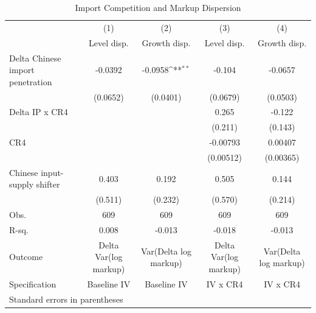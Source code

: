 \begin{table}[htbp]\centering
\def\sym#1{\ifmmode^{#1}\else\(^{#1}\)\fi}
\caption{Import Competition and Markup Dispersion}
\begin{tabular}{l*{4}{c}}
\toprule
                    &\multicolumn{1}{c}{(1)}&\multicolumn{1}{c}{(2)}&\multicolumn{1}{c}{(3)}&\multicolumn{1}{c}{(4)}\\
                    &\multicolumn{1}{c}{Level disp.}&\multicolumn{1}{c}{Growth disp.}&\multicolumn{1}{c}{Level disp.}&\multicolumn{1}{c}{Growth disp.}\\
\midrule
Delta Chinese import penetration&     -0.0392         &     -0.0958\sym{**} &      -0.104         &     -0.0657         \\
                    &    (0.0652)         &    (0.0401)         &    (0.0679)         &    (0.0503)         \\
\addlinespace
Delta IP x CR4      &                     &                     &       0.265         &      -0.122         \\
                    &                     &                     &     (0.211)         &     (0.143)         \\
\addlinespace
CR4                 &                     &                     &    -0.00793         &     0.00407         \\
                    &                     &                     &   (0.00512)         &   (0.00365)         \\
\addlinespace
Chinese input-supply shifter&       0.403         &       0.192         &       0.505         &       0.144         \\
                    &     (0.511)         &     (0.232)         &     (0.570)         &     (0.214)         \\
\midrule
Obs.                &         609         &         609         &         609         &         609         \\
R-sq.               &       0.008         &      -0.013         &      -0.018         &      -0.013         \\
Outcome             &Delta Var(log markup)         &Var(Delta log markup)         &Delta Var(log markup)         &Var(Delta log markup)         \\
Specification       & Baseline IV         & Baseline IV         &    IV x CR4         &    IV x CR4         \\
\bottomrule
\multicolumn{5}{l}{\footnotesize Standard errors in parentheses}\\

\end{tabular}
\end{table}
